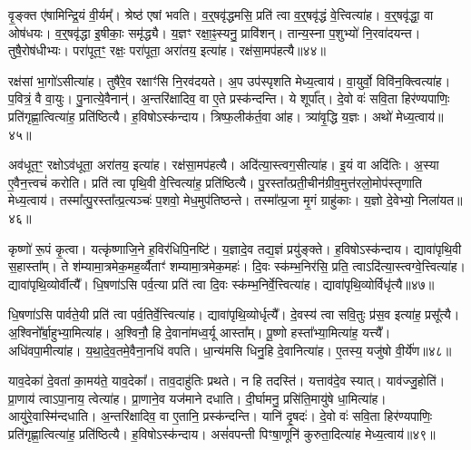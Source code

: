 वृ॒ङ्क्त ए॑षामिन्द्रि॒यं वी॒र्यम्᳚।
श्रेष्ठ॑ एषां भवति।
व॒र्॒षवृ॑द्धमसि॒ प्रति॑ त्वा व॒र्॒षवृ॑द्धं वे॒त्त्वित्या॑ह।
व॒र्॒षवृ॑द्धा॒ वा ओष॑धयः।
व॒र्॒षवृ॑द्धा इ॒षीकाः॒ समृ॑द्ध्यै।
य॒ज्ञꣳ रक्षा॒ꣴ॒स्यनु॒ प्रावि॑शन्।
तान्य॒स्ना प॒शुभ्यो॑ नि॒रवा॑दयन्त।
तुषै॒रोष॑धीभ्यः।
परा॑पूत॒ꣳ॒ रक्षः॒ परा॑पूता॒ अरा॑तय॒ इत्या॑ह।
रक्ष॑सा॒मप॑हत्यै॥४४॥\ip

रक्ष॑सां भा॒गो॑\-ऽसीत्या॑ह।
तुषै॑रे॒व रक्षाꣳ॑सि नि॒रव॑दयते।
अ॒प उप॑स्पृशति मेध्य॒त्वाय॑।
वा॒युर्वो॒ विवि॑न॒क्त्वित्या॑ह।
प॒वित्रं॒ वै वा॒युः।
पु॒नात्ये॒वैनान्॑।
अ॒न्तरि॑क्षादिव॒ वा ए॒ते प्रस्क॑न्दन्ति।
ये शूर्पा᳚त्।
दे॒वो वः॑ सवि॒ता हिर॑ण्यपाणिः॒ प्रति॑\-गृह्णा॒त्वित्या॑ह॒ प्रति॑\-ष्ठित्यै।
ह॒विषो\-ऽस्क॑न्दाय।
त्रिष्फ॒लीक॑र्त॒वा आ॑ह।
त्र्या॑वृ॒द्धि य॒ज्ञः।
अथो॑ मेध्य॒त्वाय॑॥४५॥\ip\anuvakamend[द्वाभ्या॒मुत्पु॑नाति र॒श्मयो॑ नय॒न्त्यग्रे॑ य॒ज्ञप॑तिं य॒ज्ञो\-ऽदि॑ति॒रस्क॑न्दाय गृह्णा॒मीत्या॑ह व॒देत्या॑ह॒ विजि॑त्या॒ अप॑हत्या॒ अस्क॑न्दाय॒ त्रीणि॑ च]

अव॑धूत॒ꣳ॒ रक्षो\-ऽव॑धूता॒ अरा॑तय॒ इत्या॑ह।
रक्ष॑सा॒मप॑हत्यै।
अदि॑त्या॒स्त्वग॒सीत्या॑ह।
इ॒यं वा अदि॑तिः।
अ॒स्या ए॒वैन॒त्त्वचं॑ करोति।
प्रति॑ त्वा पृथि॒वी वे॒त्त्वित्या॑ह॒ प्रति॑\-ष्ठित्यै।
पु॒रस्ता᳚त्प्रती॒चीन॑\-ग्रीव॒मुत्त॑र\-लो॒मोप॑स्तृणाति मेध्य॒त्वाय॑।
तस्मा᳚त्पु॒रस्ता᳚त्प्र॒त्यञ्चः॑ प॒शवो॒ मेध॒मुप॑तिष्ठन्ते।
तस्मा᳚त्प्र॒जा मृ॒गं ग्राहु॑काः।
य॒ज्ञो दे॒वेभ्यो॒ निला॑यत॥४६॥\ip

कृष्णो॑ रू॒पं कृ॒त्वा।
यत्कृ॑ष्णाजि॒ने ह॒विर॑धिपि॒नष्टि॑।
य॒ज्ञादे॒व तद्य॒ज्ञं प्रयु॑ङ्क्ते।
ह॒विषो\-ऽस्क॑न्दाय।
द्यावा॑पृथि॒वी स॒हास्ता᳚म्।
ते श॑म्यामा॒त्रमेक॒मह॒र्व्यैताꣳ॑ शम्यामा॒त्रमेक॒महः॑।
दि॒वः स्क॑म्भ॒निर॑सि॒ प्रति॒ त्वा\-ऽदि॑त्या॒स्त्वग्वे॒त्त्वित्या॑ह।
द्यावा॑पृथि॒व्योर्वीत्यै᳚।
धि॒षणा॑ऽसि पर्व॒त्या प्रति॑ त्वा दि॒वः स्क॑म्भ॒निर्वे॒त्त्वित्या॑ह।
द्यावा॑पृथि॒व्योर्विधृ॑त्यै॥४७॥\ip

धि॒षणा॑ऽसि पार्वते॒यी प्रति॑ त्वा पर्व॒तिर्वे॒त्त्वित्या॑ह।
द्यावा॑पृथि॒व्योर्धृत्यै᳚।
दे॒वस्य॑ त्वा सवि॒तुः प्र॑स॒व इत्या॑ह॒ प्रसू᳚त्यै।
अ॒श्विनो᳚र्बा॒हुभ्या॒मित्या॑ह।
अ॒श्विनौ॒ हि दे॒वाना॑मध्व॒र्यू आस्ता᳚म्।
पू॒ष्णो हस्ता᳚भ्या॒मित्या॑ह॒ यत्त्यै᳚।
अधि॑वपा॒मीत्या॑ह।
य॒था॒दे॒व॒तमे॒वैना॒नधि॑ वपति।
धा॒न्य॑मसि धिनु॒हि दे॒वानित्या॑ह।
ए॒तस्य॒ यजु॑षो वी॒र्ये॑ण॥४८॥\ip

याव॒देका॑ दे॒वता॑ का॒मय॑ते॒ याव॒देका᳚।
ताव॒दाहु॑तिः प्रथते।
न हि तदस्ति॑।
यत्ताव॑दे॒व स्यात्।
याव॑ज्जु॒होति॑।
प्रा॒णाय॑ त्वा\-ऽपा॒नाय॒ त्वेत्या॑ह।
प्रा॒णाने॒व यज॑माने दधाति।
दी॒र्घामनु॒ प्रसि॑ति॒मायु॑षे धा॒मित्या॑ह।
आयु॑रे॒वास्मि॑न्दधाति।
अ॒न्तरि॑क्षादिव॒ वा ए॒तानि॒ प्रस्क॑न्दन्ति।
यानि॑ दृ॒षदः॑।
दे॒वो वः॑ सवि॒ता हिर॑ण्यपाणिः॒ प्रति॑\-गृह्णा॒त्वित्या॑ह॒ प्रति॑\-ष्ठित्यै।
ह॒विषो\-ऽस्क॑न्दाय।
असं॑वपन्ती पिꣳषा॒णूनि॑ कुरुता॒दित्या॑ह मेध्य॒त्वाय॑॥४९॥\ip\anuvakamend[निला॑यत॒ विधृ॑त्यै वी॒र्ये॑ण स्कन्दन्ति च॒त्वारि॑ च]

